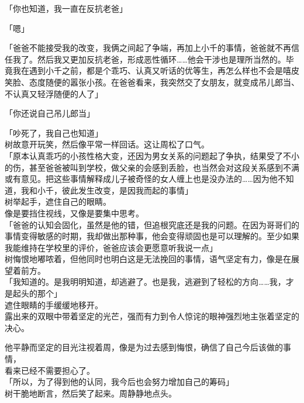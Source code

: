 「你也知道，我一直在反抗老爸」

「嗯」

「爸爸不能接受我的改变，我俩之间起了争端，再加上小千的事情，爸爸就不再信任我了。然后我又更加反抗老爸，形成恶性循环……他会干涉也是理所当然的。毕竟我在遇到小千之前，都是个乖巧、认真又听话的优等生，再怎么样也不会是嘻皮笑脸、态度随便的嚣张小孩。在爸爸看来，我突然交了女朋友，就变成吊儿郎当、不认真又轻浮随便的人了」

「你还说自己吊儿郎当」

「吵死了，我自己也知道」\\

树故意开玩笑，然后像平常一样回话。这让周松了口气。\\

「原本认真乖巧的小孩性格大变，还因为男女关系的问题起了争执，结果受了不小的伤，甚至爸爸被叫到学校，做父亲的会感到丢脸，也当然会对这段关系感到不满或有意见。把这些事情解释成儿子被奇怪的女人缠上也是没办法的……因为他不知道，我和小千，彼此发生改变，是因我而起的事情」\\

树举起手，遮住自己的眼睛。\\

像是要挡住视线，又像是要集中思考。\\

「爸爸的认知会固化，虽然是他的错，但追根究底还是我的问题。在因为哥哥们的事情变得敏感的时期，我却做出那种事，他会变得顽固也是可以理解的。至少如果我能维持在学校里的评价，爸爸应该会更愿意听我说一点」\\

树悔恨地嘟哝着，但他同时也明白这是无法挽回的事情，语气坚定有力，像是在展望着前方。\\

「我知道的。是我明明知道，却逃避了。也是我，逃避到了轻松的方向……我，才是起头的那个」\\

遮住眼睛的手缓缓地移开。\\

露出来的双眼中带着坚定的光芒，强而有力到令人惊诧的眼神强烈地主张着坚定的决心。

他平静而坚定的目光注视着周，像是为过去感到悔恨，确信了自己今后该做的事情，\\

看来已经不需要担心了。\\

「所以，为了得到他的认同，我今后也会努力增加自己的筹码」\\

树干脆地断言，然后笑了起来。周静静地点头。\\

